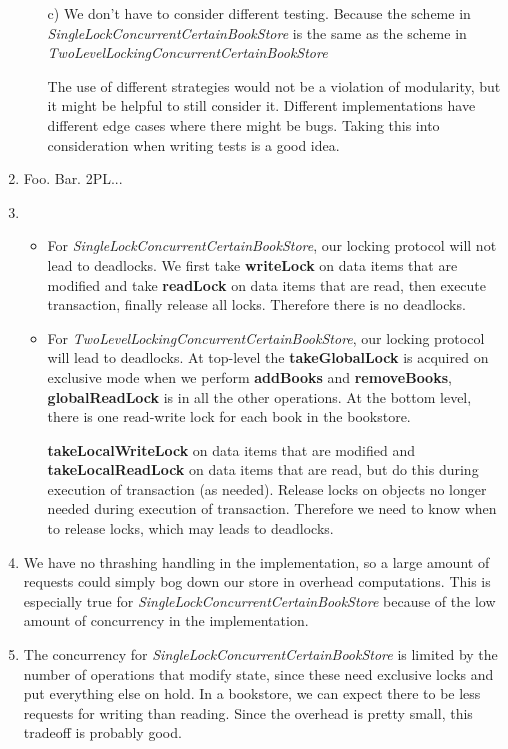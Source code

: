 \documentclass[11pt]{article}
\begin{document}
\begin{enumerate}
\begin{itemize}
		\item[c)]
      We don't have to consider different testing. Because the scheme in
      \textit{SingleLockConcurrentCertainBookStore} is the same as the scheme in
      \textit{TwoLevelLockingConcurrentCertainBookStore}
      
      The use of different strategies would not be a violation of modularity,
      but it might be helpful to still consider it. Different implementations
      have different edge cases where there might be bugs. Taking this into
      consideration when writing tests is a good idea.
		\end{itemize}
  \item
    Foo. Bar. 2PL...
	\item
		\begin{itemize}
		 \item
     For \textit{SingleLockConcurrentCertainBookStore}, our locking protocol
     will not lead to deadlocks. We first take \textbf{writeLock} on data items
     that are modified and take \textbf{readLock} on data items that are read,
     then execute transaction, finally release all locks. Therefore there is no
     deadlocks.
		 
		 \item
     For \textit{TwoLevelLockingConcurrentCertainBookStore}, our locking
     protocol will lead to deadlocks. At top-level the \textbf{takeGlobalLock}
     is acquired on exclusive mode when we perform \textbf{addBooks} and
     \textbf{removeBooks}, \textbf{globalReadLock} is in all the other
     operations. At the bottom level, there is one read-write lock for each book
     in the bookstore.

     \textbf{takeLocalWriteLock} on data items that are modified and
     \textbf{takeLocalReadLock} on data items that are read, but do this during
     execution of transaction (as needed). Release locks on objects no longer
     needed during execution of transaction. Therefore we need to know when to 
		 release locks, which may leads to deadlocks.
		\end{itemize}
  \item
    We have no thrashing handling in the implementation, so a large amount of
    requests could simply bog down our store in overhead computations. This is
    especially true for \textit{SingleLockConcurrentCertainBookStore} because of
    the low amount of concurrency in the implementation.
	
  \item
    The concurrency for \textit{SingleLockConcurrentCertainBookStore} is limited
    by the number of operations that modify state, since these need exclusive
    locks and put everything else on hold. In a bookstore, we can expect there
    to be less requests for writing than reading. Since the overhead is pretty
    small, this tradeoff is probably good.\\


\end{enumerate}
\end{document}
